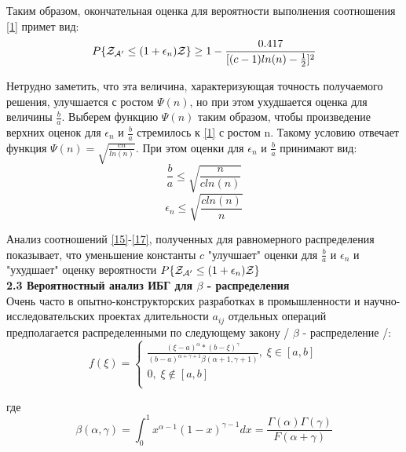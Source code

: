 \documentclass[a4paper, 14pt]{extarticle}
\begin{document}
Таким образом, окончательная оценка для вероятности выполнения соотношения \eqref{1} примет вид:
\begin{equation}\label{15}
P \{ \text{$\mathcal{Z_{A'}}$} \leq (1+\epsilon_n)\mathcal{Z} \} \geq 1 - \frac{0.417}{[(c-1)ln(n)-\frac{1}{2}]^2}
\end{equation}

Нетрудно заметить, что эта величина, характеризующая точность получаемого решения, улучшается с ростом $\Psi(n)$, но при этом ухудшается оценка для величины $\frac{b}{a}$. Выберем функцию $\Psi(n)$ таким образом, чтобы произведение верхних оценок для $\epsilon_n$ и $\frac{b}{a}$ стремилось к \eqref{1} с ростом n. Такому условию отвечает функция $\Psi(n) = \sqrt{\frac{cn}{ln(n)}}$. При этом оценки для $\epsilon_n$ и $\frac{b}{a}$ принимают вид:
\begin{equation}\label{16}
\frac{b}{a} \leq \sqrt{\frac{n}{cln(n)}}
\end{equation}
\begin{equation}\label{17}
\epsilon_n \leq \sqrt{\frac{cln(n)}{n}}
\end{equation}

Анализ соотношений \ref{15}-\ref{17}, полученных для равномерного распределения показывает, что уменьшение константы $c$ "улучшает" оценки для $\frac{b}{a}$ и $\epsilon_n$ и "ухудшает" оценку вероятности $P \{ \text{$\mathcal{Z_{A'}}$} \leq (1+\epsilon_n)\mathcal{Z} \}$\\

\textbf{2.3 Вероятностный анализ ИБГ для $\beta$ - распределения}\\

 Очень часто в опытно-конструкторских разработках в промышленности и научно-исследовательских проектах длительности $a_{ij}$ отдельных операций предполагается распределенными по следующему закону / $\beta$ - распределение /:
\begin{equation}
f(\xi) = 
\begin{cases}
   \frac{(\xi-a)^\alpha*(b-\xi)^\gamma}{(b-a)^{\alpha+\gamma+1} \beta(\alpha+1, \gamma+1)},  \; \xi \in [a,b]\\
   0, \; \xi \notin [a,b] \\
 \end{cases}
\end{equation}

где
\begin{equation}
\beta(\alpha, \gamma) = \int_0^1 x^{\alpha-1} (1-x)^{\gamma-1} dx = \frac{\Gamma(\alpha)\Gamma(\gamma)}{F(\alpha+\gamma)}
\end{equation}
\end{document}
